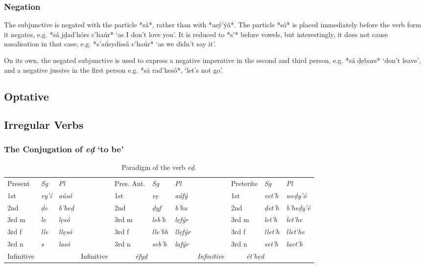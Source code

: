 \documentclass[a4paper, 12pt, oneside, final]{article}
\let \nf \normalfont
\begin{document}
\subsubsection{Negation}\label{subsubsec:negated-subjunctive}
The subjunctive is negated with the particle *sá*, rather than with *asý’ýâ*. The particle *sá* is placed
immediately before the verb form it negates, e.g. *sá jḍad’hórs c’haúr* ‘as I don’t love you’. It is reduced
to *s’* before vowels, but interestingly, it does not cause nasalisation in that case, e.g. *s’aúsydíssâ c’haúr*
‘as we didn’t say it’.

On its own, the negated subjunctive is used to express a negative imperative in the second and third person,
e.g. *sá ḍẹḅars* ‘don’t leave’, and a negative jussive in the first person e.g. *sá rad’hesó*, ‘let’s not go’.

\subsection{Optative}\label{subsec:optative}

\subsection{Irregular Verbs}\label{subsec:irregular-verbs}
\subsubsection{The Conjugation of \textit{eḍ} ‘to be’}


\begin{table}[H]
\centering
\noindent\begin{tabular}{@{}|>{}l|>{\it}l|>{\it}l|l|l|>{\it}l|>{\it}l|l|l|>{\it}l|>{\it}l|}\cline{1-3}\cline{5-7}\cline{9-11}
Present&\nf Sg&\nf Pl    && Pres. Ant.&\nf Sg&\nf Pl    && Preterite&\nf Sg&\nf Pl      \\\cline{1-3}\cline{5-7}\cline{9-11}
1st       & vy’í & aúsó   && 1st      & vẹ     & aúfý   && 1st       & vet’h & weḍy’ó   \\\cline{1-3}\cline{5-7}\cline{9-11}
2nd       & ḍe   & b’heḍ && 2nd       & ḍyf    & b’hu   && 2nd       & ḍet’h & b’heḍy’é \\\cline{1-3}\cline{5-7}\cline{9-11}
3rd m     & le   & lẹsó  && 3rd m     & leb’h  & lẹfýr  && 3rd m     & let’h & let’he   \\\cline{1-3}\cline{5-7}\cline{9-11}
3rd f     & lle  & llẹsó && 3rd f     & lle’bh & llẹfýr && 3rd f     & llet’h & llet’he \\\cline{1-3}\cline{5-7}\cline{9-11}
3rd n     & s    & lasó  && 3rd n     & seb’h  & lafýr  && 3rd n     & set’h & laet’h   \\\cline{1-3}\cline{5-7}\cline{9-11}
Infinitive& \multicolumn{2}{c|}{\it éḍ} && Infinitive& \multicolumn{2}{c|}{\it éfyḍ} && Infinitive& \multicolumn{2}{c|}{\it ét’hẹd} \\\cline{1-3}\cline{5-7}\cline{9-11}
\end{tabular}
\caption{Paradigm of the verb \emph{eḍ}.}\label{tab:ed-paradigm}
\end{table}
\end{document}
